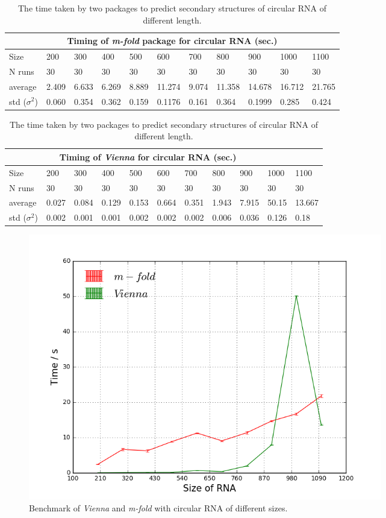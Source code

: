 \documentclass[12pt]{article}
\begin{document}
\begin{table}[H]
\begin{center}
    \begin{tabular}{ |p{1.5cm}||p{1.05cm}|p{1.05cm}|p{1.05cm}|p{1.05cm}|p{1.05cm}|p{1.05cm}|p{1.05cm}| p{1.05cm} | p{1.05cm} | p{1.05cm} |}
    \hline
    \multicolumn{11}{|c|}{Timing of \textit{m-fold} package for circular RNA (sec.)} \\
    \hline
    Size& 200& 300& 400& 500& 600& 700 & 800 & 900 & 1000 & 1100\\
    \hline
    N runs& 30 & 30& 30 & 30& 30& 30& 30& 30& 30 & 30\\
    \hline
    average& 2.409 & 6.633 & 6.269 & 8.889 & 11.274 & 9.074 & 11.358 & 14.678 &16.712 & 21.765\\
    std ($\sigma^2$) & 0.060 & 0.354 & 0.362 & 0.159 & 0.1176 & 0.161 & 0.364 & 0.1999 & 0.285 & 0.424 \\
    \hline
    \end{tabular}
    \begin{tabular}{ |p{1.5cm}||p{1.05cm}|p{1.05cm}|p{1.05cm}|p{1.05cm}|p{1.05cm}|p{1.05cm}|p{1.05cm}| p{1.05cm} | p{1.05cm} | p{1.05cm} |}
    \hline
    \multicolumn{10}{|c|}{Timing of \textit{Vienna} for circular RNA (sec.)} \\
    \hline
    Size& 200& 300& 400& 500& 600& 700 & 800 & 900 & 1000 & 1100\\
    \hline
    N runs& 30 & 30& 30 & 30& 30& 30& 30& 30& 30 & 30\\
    \hline
    average& 0.027 & 0.084 & 0.129 & 0.153 & 0.664 & 0.351 & 1.943 & 7.915 & 50.15 & 13.667 \\
    std ($\sigma^2$) & 0.002 & 0.001 & 0.001 & 0.002 & 0.002 & 0.002 & 0.006 & 0.036 & 0.126 & 0.18 \\
    \hline
    \end{tabular}
\caption{The time taken by two packages to predict secondary structures of circular RNA of different length.}
\end{center}
\end{table}
\begin{figure}[H]
    \centering
    \includegraphics[width=0.75\textwidth]{c-m-v.png}
    \caption{Benchmark of \textit{Vienna} and \textit{m-fold} with circular RNA of different sizes.}
    \label{fig:circular}
\end{figure}
\end{document}
